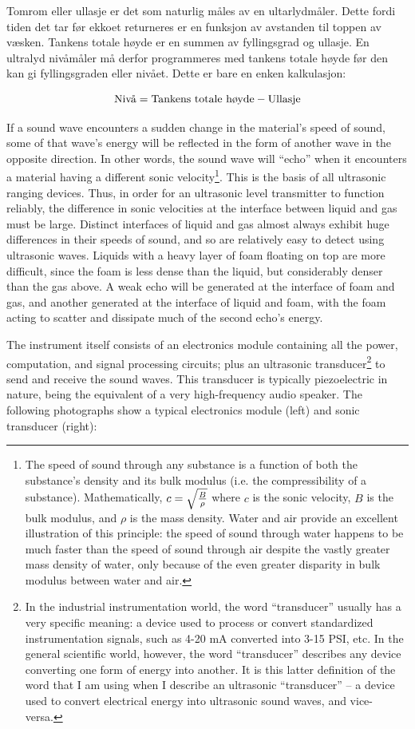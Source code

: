 Tomrom eller ullasje er det som naturlig måles av en ultarlydmåler. Dette fordi tiden det tar før ekkoet returneres er en funksjon av avstanden til toppen av væsken. Tankens totale høyde er en summen av fyllingsgrad og ullasje. En ultralyd nivåmåler må derfor programmeres med tankens totale høyde før den kan gi fyllingsgraden eller nivået. Dette er bare en enken kalkulasjon:


$$\hbox{Nivå} = \hbox{Tankens totale høyde} - \hbox{Ullasje}$$

If a sound wave encounters a sudden change in the material's speed of sound, some of that wave's energy will be reflected in the form of another wave in the opposite direction.  In other words, the sound wave will ``echo'' when it encounters a material having a different sonic velocity\footnote{The speed of sound through any substance is a function of both the substance's density and its bulk modulus (i.e. the compressibility of a substance).  Mathematically, $c = \sqrt{B \over \rho}$ where $c$ is the sonic velocity, $B$ is the bulk modulus, and $\rho$ is the mass density.  Water and air provide an excellent illustration of this principle: the speed of sound through water happens to be much faster than the speed of sound through air despite the vastly greater mass density of water, only because of the even greater disparity in bulk modulus between water and air.}.  This is the basis of all ultrasonic ranging devices.  Thus, in order for an ultrasonic level transmitter to function reliably, the difference in sonic velocities at the interface between liquid and gas must be large.  Distinct interfaces of liquid and gas almost always exhibit huge differences in their speeds of sound, and so are relatively easy to detect using ultrasonic waves.  Liquids with a heavy layer of foam floating on top are more difficult, since the foam is less dense than the liquid, but considerably denser than the gas above.  A weak echo will be generated at the interface of foam and gas, and another generated at the interface of liquid and foam, with the foam acting to scatter and dissipate much of the second echo's energy.    

\filbreak

The instrument itself consists of an electronics module containing all the power, computation, and signal processing circuits; plus an ultrasonic transducer\footnote{In the industrial instrumentation world, the word ``transducer'' usually has a very specific meaning: a device used to process or convert standardized instrumentation signals, such as 4-20 mA converted into 3-15 PSI, etc.  In the general scientific world, however, the word ``transducer'' describes any device converting one form of energy into another.  It is this latter definition of the word that I am using when I describe an ultrasonic ``transducer'' -- a device used to convert electrical energy into ultrasonic sound waves, and vice-versa.} to send and receive the sound waves.  This transducer is typically piezoelectric in nature, being the equivalent of a very high-frequency audio speaker.  The following photographs show a typical electronics module (left) and sonic transducer (right):

